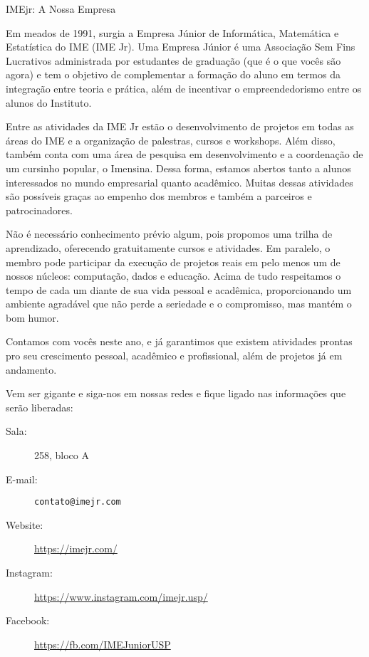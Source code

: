 \begin{subsecao}{IMEjr: A Nossa Empresa}


Em meados de 1991, surgia a Empresa Júnior de Informática, Matemática e Estatística 
do IME (IME Jr). Uma Empresa Júnior é uma Associação Sem Fins Lucrativos administrada 
por estudantes de graduação (que é o que vocês são agora) e tem o objetivo de complementar 
a formação do aluno em termos da integração entre teoria e prática, além de incentivar 
o empreendedorismo entre os alunos do Instituto. 

Entre as atividades da IME Jr estão o desenvolvimento de projetos em todas as áreas do IME 
e a organização de palestras, cursos e workshops. Além disso, também conta com uma área de 
pesquisa em desenvolvimento e a coordenação de um cursinho popular, o Imensina. Dessa forma, 
estamos abertos tanto a alunos interessados no mundo empresarial quanto acadêmico. Muitas 
dessas atividades são possíveis graças ao empenho dos membros e também a parceiros e patrocinadores. 

Não é necessário conhecimento prévio algum, pois propomos uma trilha de aprendizado, oferecendo 
gratuitamente cursos e atividades. Em paralelo, o membro pode participar da execução de projetos 
reais em pelo menos um de nossos núcleos: computação, dados e educação. Acima de tudo respeitamos 
o tempo de cada um diante de sua vida pessoal e acadêmica, proporcionando um ambiente agradável que 
não perde a seriedade e o compromisso, mas mantém o bom humor.

Contamos com vocês neste ano, e já garantimos que existem atividades prontas pro seu crescimento pessoal, 
acadêmico e profissional, além de projetos já em andamento.

Vem ser gigante e siga-nos em nossas redes e fique ligado nas informações que serão liberadas:

\begin{description}
\item [Sala:] 258, bloco A
\item[E-mail:] \texttt{contato@imejr.com}
\item[Website:] \url{https://imejr.com/}
\item[Instagram:] \url{https://www.instagram.com/imejr.usp/}
\item[Facebook:] \url{https://fb.com/IMEJuniorUSP}
\end{description}

\end{subsecao}
